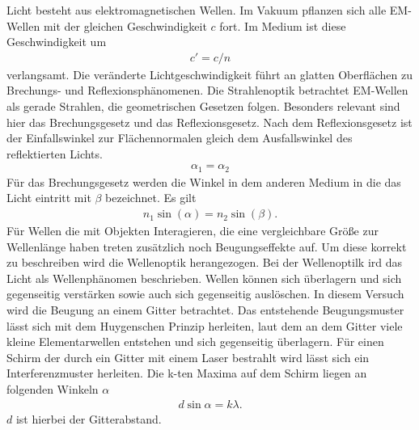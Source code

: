 Licht besteht aus elektromagnetischen Wellen.
Im Vakuum pflanzen sich alle EM-Wellen mit der gleichen Geschwindigkeit $c$ fort.
Im Medium ist diese Geschwindigkeit um 
\begin{align}
c'=c/n 
\label{eq:c_n}
\end{align}
verlangsamt.
Die veränderte Lichtgeschwindigkeit führt an glatten Oberflächen zu Brechungs- und Reflexionsphänomenen.
Die Strahlenoptik betrachtet EM-Wellen als gerade Strahlen, die geometrischen Gesetzen folgen.
Besonders relevant sind hier das Brechungsgesetz und das Reflexionsgesetz.
Nach dem Reflexionsgesetz ist der Einfallswinkel zur Flächennormalen gleich dem Ausfallswinkel des reflektierten Lichts.
\begin{align}
    \alpha_1 =\alpha_2
    \label{eq:reflexion}
\end{align}
Für das Brechungsgesetz werden die Winkel in dem anderen Medium in die das Licht eintritt mit $\beta$ bezeichnet.
Es gilt 
\begin{align}
    n_1 \sin(\alpha) = n_2 \sin(\beta).
    \label{eq:brechung}
\end{align}
Für Wellen die mit Objekten Interagieren, die eine vergleichbare Größe zur Wellenlänge haben 
treten zusätzlich noch Beugungseffekte auf.
Um diese korrekt zu beschreiben wird die Wellenoptik herangezogen.
Bei der Wellenoptilk ird das Licht als Wellenphänomen beschrieben.
Wellen können sich überlagern und sich gegenseitig verstärken sowie auch sich gegenseitig auslöschen.
In diesem Versuch wird die Beugung an einem Gitter betrachtet.
Das entstehende Beugungsmuster lässt sich mit dem Huygenschen Prinzip herleiten,
laut dem an dem Gitter viele kleine Elementarwellen entstehen und sich gegenseitig überlagern.
Für einen Schirm der durch ein Gitter mit einem Laser bestrahlt wird lässt sich ein Interferenzmuster herleiten.
Die k-ten Maxima auf dem Schirm liegen an folgenden Winkeln $\alpha$
\begin{align}
    d \sin{\alpha} = k \lambda.
    \label{eq:beugung}
\end{align}
$d$ ist hierbei der Gitterabstand.

